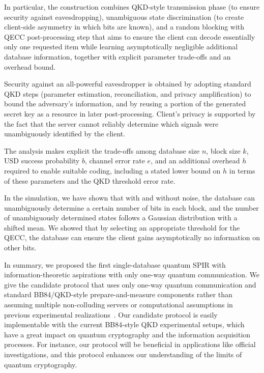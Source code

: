 \documentclass[%
 reprint,
superscriptaddress,
 amsmath,amssymb,
 aps,
]{revtex4-2}
\begin{document}
In particular, the construction combines QKD-style transmission phase (to ensure security against eavesdropping), unambiguous state discrimination (to create client-side asymmetry in which bits are known), and a random blocking with QECC post-processing step that aims to ensure the client can decode essentially only one requested item while learning asymptotically negligible additional database information, together with explicit parameter trade-offs and an overhead bound.

Security against an all-powerful eavesdropper is obtained by adopting standard QKD steps (parameter estimation, reconciliation, and privacy amplification) to bound the adversary's information, and by reusing a portion of the generated secret key as a resource in later post-processing. Client's privacy is supported by the fact that the server cannot reliably determine which signals were unambiguously identified by the client.

The analysis makes explicit the trade-offs among database size $n$, block size $k$, USD success probability $b$, channel error rate $e$, and an additional overhead $h$ required to enable suitable coding, including a stated lower bound on $h$ in terms of these parameters and the QKD threshold error rate. 

In the simulation, we have shown that with and without noise, the database can unambiguously determine a certain number of bits in each block, and the number of unambiguously determined states follows a Gaussian distribution with a shifted mean. We showed that by selecting an appropriate threshold for the QECC, the database can ensure the client gains asymptotically no information on other bits.

In summary, we proposed the first single-database quantum SPIR with information-theoretic aspirations with only one-way quantum communication. We give the candidate protocol that uses only one-way quantum communication and standard BB84/QKD-style prepare-and-measure components rather than assuming multiple non-colluding servers or computational assumptions in previous experimental realizations~\cite{QSPIR_multiple_database1, QSPIR_multiple_database2, QSPIR_theory1}. Our candidate protocol is easily implementable with the current BB84-style QKD experimental setups, which have a great impact on quantum cryptography and the information acquisition processes. For instance, our protocol will be beneficial in applications like official investigations, and this protocol enhances our understanding of the limits of quantum cryptography.
\end{document}
